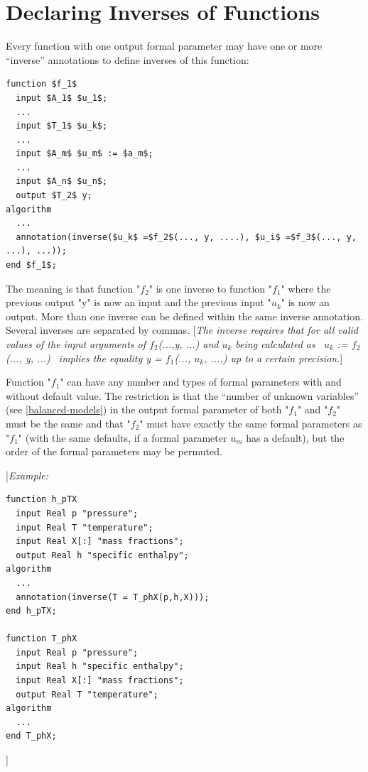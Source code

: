 \documentclass[10pt,a4paper]{report}
\def\doublelabel#1{\label{#1}}
\begin{document}
\section{Declaring Inverses of Functions}\doublelabel{declaring-inverses-of-functions}

Every function with one output formal parameter may have one or more
``inverse'' annotations to define inverses of this function:

\begin{lstlisting}[language=modelica,mathescape=true]
function $f_1$
  input $A_1$ $u_1$;
  ...
  input $T_1$ $u_k$;
  ...
  input $A_m$ $u_m$ := $a_m$;
  ...
  input $A_n$ $u_n$;
  output $T_2$ y;
algorithm
  ...
  annotation(inverse($u_k$ =$f_2$(..., y, ....), $u_i$ =$f_3$(..., y, ...), ...));
end $f_1$;
\end{lstlisting}

The meaning is that function "$f_2$" is one inverse to
function "$f_1$" where the previous output "y" is now an
input and the previous input "$u_k$" is now an output. More
than one inverse can be defined within the same inverse annotation.
Several inverses are separated by commas. {[}\emph{The inverse requires
that for all valid values of the input arguments of
$f_2$(...,y, ...) and $u_k$ being calculated
as~ $u_k$ := $f_2$(..., y, ...)~ implies the
equality y = $f_1$(..., $u_k$, ...,) up to a
certain precision.}{]}

Function "$f_1$" can have any number and types of formal
parameters with and without default value. The restriction is that the
``number of unknown variables'' (see \ref{balanced-models}) in the output formal
parameter of both "$f_1$" and "$f_2$" must be
the same and that "$f_2$" must have exactly the same formal
parameters as "$f_1$" (with the same defaults, if a formal
parameter $u_m$ has a default), but the order of the formal
parameters may be permuted.

{[}\emph{Example:}

\begin{lstlisting}[language=modelica]
function h_pTX
  input Real p "pressure";
  input Real T "temperature";
  input Real X[:] "mass fractions";
  output Real h "specific enthalpy";
algorithm
  ...
  annotation(inverse(T = T_phX(p,h,X)));
end h_pTX;

function T_phX
  input Real p "pressure";
  input Real h "specific enthalpy";
  input Real X[:] "mass fractions";
  output Real T "temperature";
algorithm
  ...
end T_phX;
\end{lstlisting}
{]}
\end{document}
